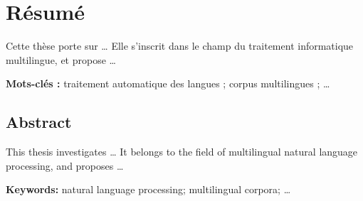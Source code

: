 \chapter*{Résumé}

Cette thèse porte sur \dots{} %
Elle s'inscrit dans le champ du traitement
informatique multilingue, et propose \dots

\bigskip
\noindent\textbf{Mots-clés :} traitement automatique
des langues ; corpus multilingues ; \dots

\vspace{1.5cm}

\begin{english}
\section*{Abstract}

This thesis investigates \dots{} %
It belongs to the field of multilingual
natural language processing, and proposes \dots

\bigskip
\noindent\textbf{Keywords:} natural language
processing; multilingual corpora; \dots
\end{english}

